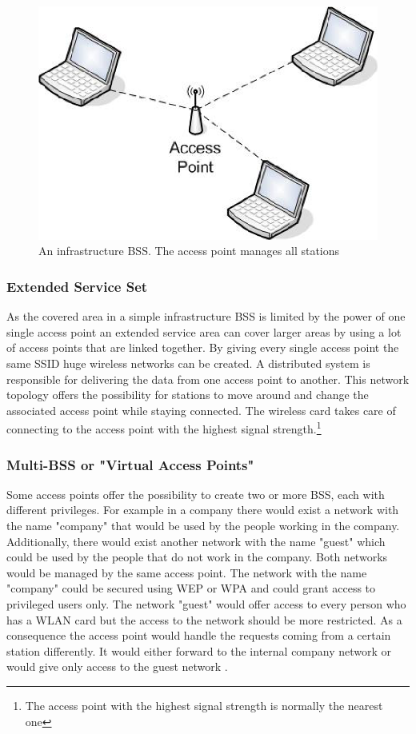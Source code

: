 \begin{figure}[htbp]
	\begin{center}
		\includegraphics[width=0.5\columnwidth]{graphics/InfrastructureBSS}
	\end{center}
	\vspace{-1em}
	\caption{An infrastructure BSS. The access point manages all stations}
	\label{infrastructurebss}
\end{figure}

\subsubsection{Extended Service Set}

As the covered area in a simple infrastructure BSS is limited by the power of one single access point an extended service area can cover larger areas by using a lot of access points that are linked together. By giving every single access point the same \ac{SSID} huge wireless networks can be created. A distributed system is responsible for delivering the data from one access point to another. This network topology offers the possibility for stations to move around and change the associated access point while staying connected. The wireless card takes care of connecting to the access point with the highest signal strength.\footnote{The access point with the highest signal strength is normally the nearest one}

\subsubsection{Multi-BSS or "Virtual Access Points"}

Some access points offer the possibility to create two or more BSS, each with 	different privileges. For example in a company there would exist a network with the name "company" that would be used by the people working in the company. Additionally, there would exist another network with the name "guest" which could be used by the people that do not work in the company. Both networks would be managed by the same access point. The network with the name "company" could be secured using \ac{WEP} or \ac{WPA} and could grant access to privileged users only. The network "guest" would offer access to every person who has a WLAN card but the access to the network should be more restricted. As a consequence the access point would handle the requests coming from a certain station differently. It would either forward to the internal company network or would give only access to the guest network \cite[p.19]{80211wireless}.
\pagebreak
